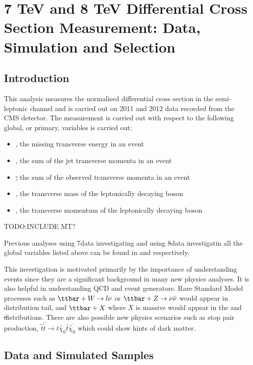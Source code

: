 \chapter{7 TeV and 8 TeV Differential Cross Section Measurement: Data, Simulation and Selection}
\label{c:Differential_Cross_Section:data_simulation_and_selection}

\section{Introduction}
\label{s:analysis1_introduction}
This analysis measures the normalised differential \ttbar cross section in the semi-leptonic channel and is
carried out on 2011 and 2012 data recorded from the CMS detector. The measurement is carried out with respect
to the following global, or primary, variables is carried out:
\begin {itemize}
  \item {\met, the missing transverse energy in an event}
  \item {\HT, the sum of the jet transverse momenta in an event}
  \item {\st, the sum of the observed transverse momenta in an event}
  \item {\mt, the transverse mass of the leptonically decaying \W boson}
  \item {\wpt, the transverse momentum of the leptonically decaying \W boson}
\end{itemize}

TODO:INCLUDE MT? %

Previous analyses using 7\TeV data investigating \met and using 8\TeV data investigatin all the
global variables listed above can be found in \cite{CMS-PAS-TOP-12-019} and \cite{CMS-PAS-TOP-12-042} respectively.

This investigation is motivated primarily by the importance of understanding \ttbar events since they are a
significant background in many new physics analyses. It is also helpful in understanding QCD and event
generators. Rare Standard Model processes such as $\ttbar + W\rightarrow l\nu$ or $\ttbar + Z\rightarrow
\nu\bar{\nu}$ would appear in \met distribution tail, and $\ttbar + X$ where $X$ is massive would appear in
the \HT and \st distributions. There are also possible new physics scenarios such as stop pair production,
$\tilde{t}\bar{\tilde{t}} \rightarrow t\tilde{\chi_0} \bar{t}\bar{\tilde{\chi_0}}$ which could show
hints of dark matter.

\section{Data and Simulated Samples}
\label{s:data_and_simulated_samples}

